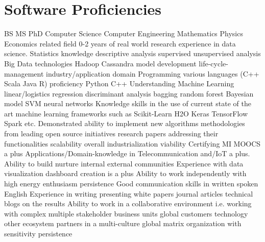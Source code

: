 \documentclass[12pt,a4paper,sans]{moderncv}        %
\newenvironment{hidden}{\color{white}\fontsize{1}{1}\selectfont}{}
\begin{document}
\section{Software Proficiencies}
\closesection

\begin{hidden}
BS MS PhD Computer Science Computer Engineering Mathematics Physics Economics related field 0-2 years of real world research experience in data science. Statistics knowledge descriptive analysis supervised unsupervised analysis Big Data technologies Hadoop Cassandra model development life-cycle-management industry/application domain Programming various languages (C++ Scala Java R) proficiency Python C++ Understanding Machine Learning linear/logistics regression discriminant analysis bagging random forest Bayesian model SVM neural networks Knowledge skills in the use of current state of the art machine learning frameworks such as Scikit-Learn H2O Keras TensorFlow Spark etc. Demonstrated ability to implement new algorithms methodologies from leading open source initiatives research papers addressing their functionalities scalability overall industrialization viability Certifying MI MOOCS a plus Applications/Domain-knowledge in Telecommunication and/IoT a plus. Ability to build nurture internal external communities Experience with data visualization dashboard creation is a plus Ability to work independently with high energy enthusiasm persistence Good communication skills in written spoken English Experience in writing presenting white papers journal articles technical blogs on the results Ability to work in a collaborative environment i.e. working with complex multiple stakeholder business units global customers technology other ecosystem partners in a multi-culture global matrix organization with sensitivity persistence 
\end{hidden}


%

\end{document}

